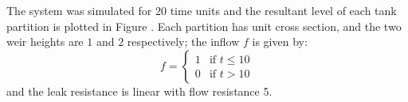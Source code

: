 The system was simulated for 20 time units and the resultant level of
each tank partition is plotted in Figure . Each
partition has unit cross section, and the two weir heights are $1$ and
$2$ respectively; the inflow $f$ is given by:
\begin{equation}
  f = 
  \begin{cases}
    1 & \text{if $t \le 10$}\\
    0 & \text{if $t > 10$}
  \end{cases}
\end{equation}
and the leak resistance is linear with flow resistance 5.


